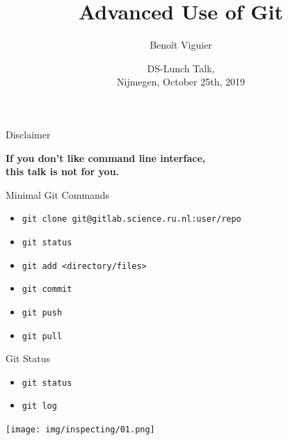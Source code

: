 \documentclass[usenames,dvipsnames,9pt]{beamer}
\title{Advanced Use of Git}
\author[Viguier]
{Beno\^{i}t Viguier}
\date[Short Occasion]{\vspace{0.5cm}DS-Lunch Talk,\\Nijmegen, October 25th, 2019}
\begin{document}
%
\begin{frame}
  \titlepage
\end{frame}


\begin{frame}{Disclaimer}
  \begin{center}
    \alert{\Large{\textbf{If you don't like command line interface,\\this talk is not for you.}}}
  \end{center}
\end{frame}

%
\begin{frame}{Minimal Git Commands}
  \begin{itemize}
    \item \lstinline|git clone git@gitlab.science.ru.nl:user/repo|
    \item \lstinline|git status|
    \item \lstinline|git add <directory/files>|
    \item \lstinline|git commit|
    \item \lstinline|git push|
    \item \lstinline|git pull|
  \end{itemize}
\end{frame}

%
\begin{frame}{Git Status}
  \begin{itemize}
    \item \lstinline|git status|
    \item \lstinline|git log|
  \end{itemize}

  \texttt{[image: img/inspecting/01.png]}
\end{frame}
\end{document}
